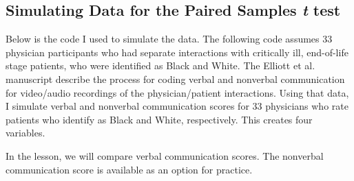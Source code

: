 \documentclass[
  11pt,
]{book}
\begin{document}
\hypertarget{simulating-data-for-the-paired-samples-t-test}{%
\subsection{\texorpdfstring{Simulating Data for the Paired Samples \emph{t} test}{Simulating Data for the Paired Samples t test}}\label{simulating-data-for-the-paired-samples-t-test}}

Below is the code I used to simulate the data. The following code assumes 33 physician participants who had separate interactions with critically ill, end-of-life stage patients, who were identified as Black and White. The Elliott et al. \citeyearpar{elliott_differences_2016} manuscript describe the process for coding verbal and nonverbal communication for video/audio recordings of the physician/patient interactions. Using that data, I simulate verbal and nonverbal communication scores for 33 physicians who rate patients who identify as Black and White, respectively. This creates four variables.

In the lesson, we will compare verbal communication scores. The nonverbal communication score is available as an option for practice.
\end{document}

